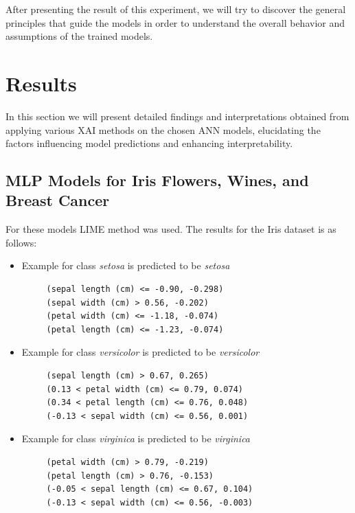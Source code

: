 \documentclass[journal, a4paper]{IEEEtran}
\begin{document}
After presenting the result of this experiment, we will try to discover the general principles that guide the models in order to understand the overall behavior and assumptions of the trained models.

\section{Results}\label{sec:results}
In this section we will present detailed findings and interpretations obtained from applying various XAI methods on the chosen ANN models, elucidating the factors influencing model predictions and enhancing interpretability.

\subsection{MLP Models for Iris Flowers, Wines, and Breast Cancer}\label{subsec:experiment-other-datasets}
For these models LIME method was used.
The results for the Iris dataset is as follows:
\begin{itemize}
    \item Example for class \textit{setosa} is predicted to be \textit{setosa} \\
    {\tiny
    \begin{verbatim}
     (sepal length (cm) <= -0.90, -0.298)
     (sepal width (cm) > 0.56, -0.202)
     (petal width (cm) <= -1.18, -0.074)
     (petal length (cm) <= -1.23, -0.074)
    \end{verbatim}
    }

    \item Example for class \textit{versicolor} is predicted to be \textit{versicolor} \\
    {\tiny
    \begin{verbatim}
     (sepal length (cm) > 0.67, 0.265)
     (0.13 < petal width (cm) <= 0.79, 0.074)
     (0.34 < petal length (cm) <= 0.76, 0.048)
     (-0.13 < sepal width (cm) <= 0.56, 0.001)
    \end{verbatim}
    }

    \item Example for class \textit{virginica} is predicted to be \textit{virginica} \\
    {\tiny
    \begin{verbatim}
     (petal width (cm) > 0.79, -0.219)
     (petal length (cm) > 0.76, -0.153)
     (-0.05 < sepal length (cm) <= 0.67, 0.104)
     (-0.13 < sepal width (cm) <= 0.56, -0.003)
    \end{verbatim}
    }
\end{itemize}
\end{document}
